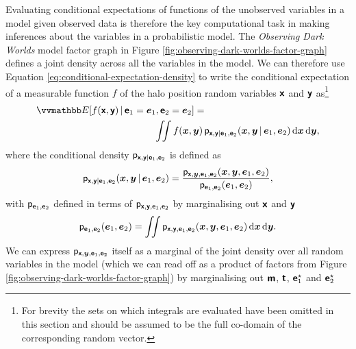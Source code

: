 Evaluating conditional expectations of functions of the unobserved variables in a model given observed data is therefore the key computational task in making inferences about the variables in a probabilistic model. The \emph{Observing Dark Worlds} model factor graph in Figure \ref{fig:observing-dark-worlds-factor-graph} defines a joint density across all the variables in the model. We can therefore use Equation \eqref{eq:conditional-expectation-density} to write the conditional expectation of a measurable function $f$ of the halo position random variables $\boldsymbol{\mathsf{x}}$ and $\boldsymbol{\mathsf{y}}$ as\footnote{For brevity the sets on which integrals are evaluated have been omitted in this section and should be assumed to be the full co-domain of the corresponding random vector.}
\begin{equation}\label{eq:odw-conditional-expectation}
\begin{split}
  \expc{f(\rvct{x},\rvct{y}) \gvn \rvct{e}_1 =\vct{e}_1, \rvct{e}_2=\vct{e}_2} =&\\
  \iint
    f(\vct{x},\vct{y})\,
    &\pden{\rvct{x},\rvct{y} | \rvct{e}_1,\rvct{e}_2}(\vct{x},\vct{y} \gvn \vct{e}_1,\vct{e}_2)
  \,\dr\vct{x}\,\dr\vct{y},
\end{split}
\end{equation}
where the conditional density $\mathsf{p}_{\boldsymbol{\mathsf{x}},\boldsymbol{\mathsf{y}} | \boldsymbol{\mathsf{e}}_1,\boldsymbol{\mathsf{e}}_2}$ is defined as
\begin{equation}
  \mathsf{p}_{\boldsymbol{\mathsf{x}},\boldsymbol{\mathsf{y}} | \boldsymbol{\mathsf{e}}_1,\boldsymbol{\mathsf{e}}_2}(\boldsymbol{x},\boldsymbol{y} \operatorname{|} \boldsymbol{e}_1,\boldsymbol{e}_2) =
  \frac
    {\mathsf{p}_{\boldsymbol{\mathsf{x}},\boldsymbol{y},\boldsymbol{\mathsf{e}}_1,\boldsymbol{\mathsf{e}}_2}(\boldsymbol{x},\boldsymbol{y},\boldsymbol{e}_1,\boldsymbol{e}_2)}
    {\mathsf{p}_{\boldsymbol{\mathsf{e}}_1,\boldsymbol{\mathsf{e}}_2}(\boldsymbol{e}_1,\boldsymbol{e}_2)},
\end{equation}
with $\mathsf{p}_{\boldsymbol{\mathsf{e}}_1,\boldsymbol{\mathsf{e}}_2}$ defined in terms of $\mathsf{p}_{\boldsymbol{\mathsf{x}},\boldsymbol{\mathsf{y}},\boldsymbol{\mathsf{e}}_1,\boldsymbol{\mathsf{e}}_2}$ by marginalising out $\boldsymbol{\mathsf{x}}$ and $\boldsymbol{\mathsf{y}}$
\begin{equation}
  \mathsf{p}_{\boldsymbol{\mathsf{e}}_1,\boldsymbol{\mathsf{e}}_2}(\boldsymbol{e}_1,\boldsymbol{e}_2) =
  \iint 
    \mathsf{p}_{\boldsymbol{\mathsf{x}},\boldsymbol{\mathsf{y}},\boldsymbol{\mathsf{e}}_1,\boldsymbol{\mathsf{e}}_2}(\boldsymbol{x},\boldsymbol{y},\boldsymbol{e}_1,\boldsymbol{e}_2) 
  \,\mathrm{d}\boldsymbol{x}\,\mathrm{d}\boldsymbol{y}.
\end{equation}
We can express $\mathsf{p}_{\boldsymbol{\mathsf{x}},\boldsymbol{y},\boldsymbol{\mathsf{e}}_1,\boldsymbol{\mathsf{e}}_2}$ itself as a marginal of the joint density over all random variables in the model (which we can read off as a product of factors from Figure \ref{fig:observing-dark-worlds-factor-graph}) by marginalising out $\boldsymbol{\mathsf{m}}$, $\boldsymbol{\mathsf{t}}$, $\boldsymbol{\mathsf{e}}_1^\star$ and $\boldsymbol{\mathsf{e}}_2^\star$
